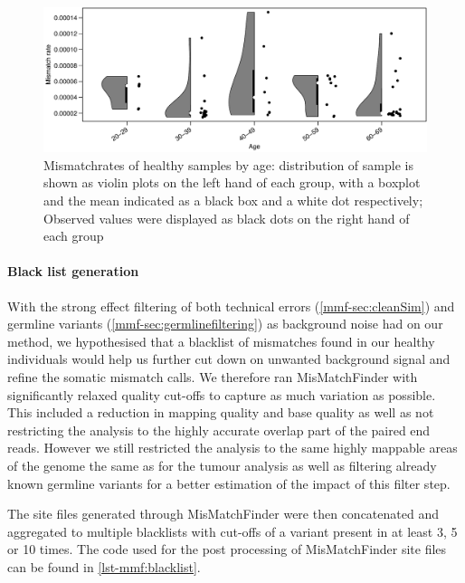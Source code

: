 \begin{figure}[ht]
\centering
\includegraphics[width=.99\linewidth]{Figures/MisMatchFinder/MisMatchRateByAge.pdf}
\caption[Mismatchrates of healthy samples by age]{Mismatchrates of healthy samples by age: distribution of sample is shown as violin plots on the left hand of each group, with a boxplot and the mean indicated as a black box and a white dot respectively; Observed values were displayed as black dots on the right hand of each group}\label{fig:mmf-mmrByAge}
\end{figure}


\paragraph{Black list generation}
\label{mmf-sec:healthyBlacklist}
With the strong effect filtering of both technical errors (\autoref{mmf-sec:cleanSim}) and germline variants (\autoref{mmf-sec:germlinefiltering})  as background noise had on our method, we hypothesised that a blacklist of mismatches found in our healthy individuals would help us further cut down on unwanted background signal and refine the somatic mismatch calls. We therefore ran MisMatchFinder with significantly relaxed quality cut-offs to capture as much variation as possible. This included a reduction in mapping quality and base quality as well as not restricting the analysis to the highly accurate overlap part of the paired end reads. However we still restricted the analysis to the same highly mappable areas of the genome the same as for the tumour analysis as well as filtering already known germline variants for a better estimation of the impact of this filter step.

The site files generated through MisMatchFinder were then concatenated and aggregated to multiple blacklists with cut-offs of a variant present in at least 3, 5 or 10 times. The code used for the post processing of MisMatchFinder site files can be found in \autoref{lst-mmf:blacklist}.


